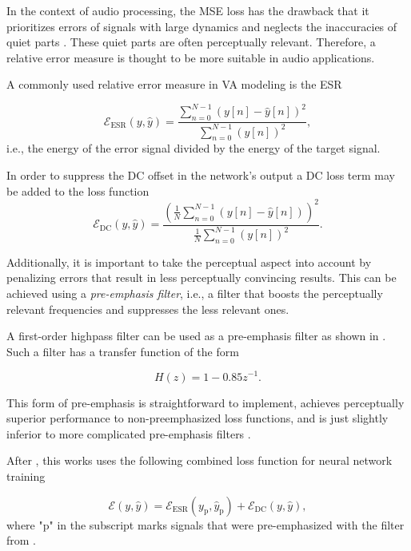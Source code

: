 In the context of audio processing, the \ac{MSE} loss has the drawback that it prioritizes errors of signals with large dynamics and neglects the inaccuracies of quiet parts \cite{Parker2019}. These quiet parts are often perceptually relevant. Therefore, a relative error measure is thought to be more suitable in audio applications.

A commonly used relative error measure in \ac{VA} modeling is the \ac{ESR} \cite{Wright2019,Wright2019a, Wrightetal2020,Wright2020}

\begin{equation}
  \mathcal{E}_\text{ESR}(y, \hat{y}) = \frac{\sum_{n=0}^{N-1} (y[n] - \hat{y}[n])^2}{\sum_{n=0}^{N-1} (y[n])^2},
  \label{eq:esr}
\end{equation}
i.e., the energy of the error signal divided by the energy of the target signal.

In order to suppress the DC offset in the network's output a DC loss term may be added to the loss function \cite{Wright2019a,Wright2020}
\begin{equation}
  \mathcal{E}_\text{DC}(y, \hat{y}) = \frac{\left(\frac{1}{N} \sum_{n=0}^{N-1} (y[n] - \hat{y}[n])\right)^2}{\frac{1}{N} \sum_{n=0}^{N-1} (y[n])^2}.
\end{equation}

Additionally, it is important to take the perceptual aspect into account by penalizing errors that result in less perceptually convincing results. This can be achieved using a \emph{pre-emphasis filter}, i.e., a filter that boosts the perceptually relevant frequencies and suppresses the less relevant ones.

A first-order highpass filter can be used as a pre-emphasis filter as shown in \cite{Wright2019,Wrightetal2020,Wright2020}. Such a filter has a transfer function of the form

\begin{equation}
  H(z) = 1 - 0.85 z^{-1}.
  \label{eq:preemphasis_filter}
\end{equation}

This form of pre-emphasis is straightforward to implement, achieves perceptually superior performance to non-preemphasized loss functions, and is just slightly inferior to more complicated pre-emphasis filters \cite{Wright2019a}.

After \cite{Wright2019a,Wright2020,Wright2019}, this works uses the following combined loss function for neural network training

\begin{equation}
  \mathcal{E}(y, \hat{y}) = \mathcal{E}_\text{ESR}(y_\text{p}, \hat{y}_\text{p}) + \mathcal{E}_\text{DC}(y, \hat{y}),
  \label{eq:final_loss_function}
\end{equation}
where "p" in the subscript marks signals that were pre-emphasized with the filter from .

